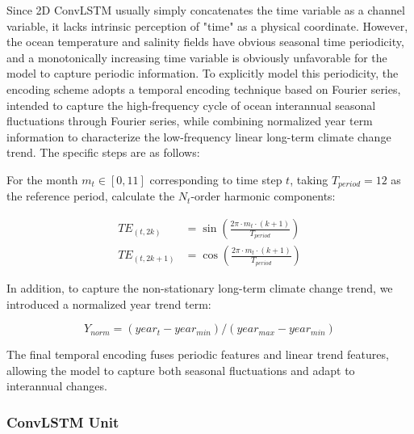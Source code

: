 \documentclass[webpdf,contemporary,large]{oup-authoring-template}
\begin{document}
Since 2D ConvLSTM usually simply concatenates the time variable as a channel variable, it lacks intrinsic perception of "time" as a physical coordinate. However, the ocean temperature and salinity fields have obvious seasonal time periodicity, and a monotonically increasing time variable is obviously unfavorable for the model to capture periodic information. To explicitly model this periodicity, the encoding scheme adopts a temporal encoding technique based on Fourier series, intended to capture the high-frequency cycle of ocean interannual seasonal fluctuations through Fourier series, while combining normalized year term information to characterize the low-frequency linear long-term climate change trend. The specific steps are as follows:

For the month $m_t \in [0, 11]$ corresponding to time step $t$, taking $T_{period}=12$ as the reference period, calculate the $N_t$-order harmonic components:

\begin{equation}
\begin{aligned}
TE_{(t, 2k)} &= \sin\left(\frac{2\pi \cdot m_t \cdot (k+1)}{T_{period}}\right) \\
TE_{(t, 2k+1)} &= \cos\left(\frac{2\pi \cdot m_t \cdot (k+1)}{T_{period}}\right)
\end{aligned}
\end{equation}

In addition, to capture the non-stationary long-term climate change trend, we introduced a normalized year trend term:

\begin{equation}
Y_{norm} = (year_t - year_{min}) / (year_{max} - year_{min})
\end{equation}

The final temporal encoding fuses periodic features and linear trend features, allowing the model to capture both seasonal fluctuations and adapt to interannual changes.

\subsubsection{ConvLSTM Unit}
\end{document}
